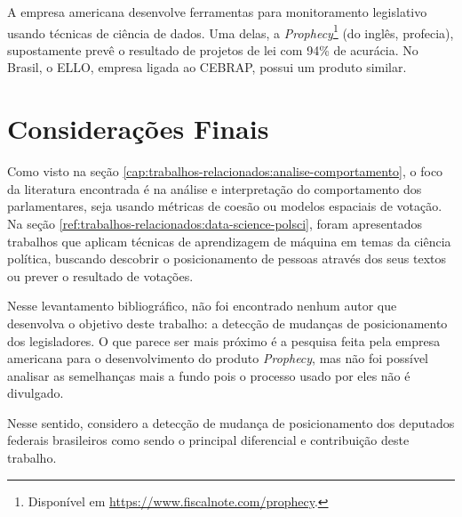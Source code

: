 A empresa americana  desenvolve ferramentas para
monitoramento legislativo usando técnicas de ciência de dados. Uma delas, a
\emph{Prophecy}\footnote{Disponível em
\url{https://www.fiscalnote.com/prophecy}.} (do inglês, profecia), supostamente
prevê o resultado de projetos de lei com 94\% de acurácia. No Brasil, o
\gls{ELLO}, empresa ligada ao \gls{CEBRAP}, possui um produto similar.

\section{Considerações Finais}

Como visto na seção \ref{cap:trabalhos-relacionados:analise-comportamento}, o
foco da literatura encontrada é na análise e interpretação do comportamento dos
parlamentares, seja usando métricas de coesão ou modelos espaciais de votação.
Na seção \ref{ref:trabalhos-relacionados:data-science-polsci}, foram
apresentados trabalhos que aplicam técnicas de aprendizagem de máquina em temas
da ciência política, buscando descobrir o posicionamento de pessoas através dos
seus textos ou prever o resultado de votações.

Nesse levantamento bibliográfico, não foi encontrado nenhum autor que
desenvolva o objetivo deste trabalho: a detecção de mudanças de posicionamento
dos legisladores. O que parece ser mais próximo é a pesquisa feita pela empresa
americana  para o desenvolvimento do produto
\emph{Prophecy}, mas não foi possível analisar as semelhanças mais a fundo pois
o processo usado por eles não é divulgado.

Nesse sentido, considero a detecção de mudança de posicionamento dos deputados
federais brasileiros como sendo o principal diferencial e contribuição deste
trabalho.
